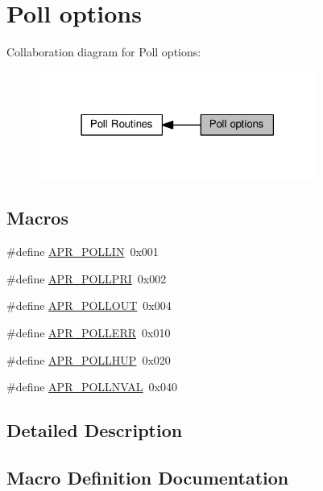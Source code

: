 \hypertarget{group__pollopts}{}\section{Poll options}
\label{group__pollopts}
Collaboration diagram for Poll options\+:
\nopagebreak
\begin{figure}[H]
\begin{center}
\leavevmode
\includegraphics[width=259pt]{group__pollopts}
\end{center}
\end{figure}
\subsection*{Macros}
\begin{DoxyCompactItemize}
\item 
\#define \hyperlink{group__pollopts_ga746222e6b858bc2fc77328d59f78e788}{A\+P\+R\+\_\+\+P\+O\+L\+L\+IN}~0x001
\item 
\#define \hyperlink{group__pollopts_ga196c38e1914077c4c9a0cf3ce87f1b9c}{A\+P\+R\+\_\+\+P\+O\+L\+L\+P\+RI}~0x002
\item 
\#define \hyperlink{group__pollopts_ga6fb703db1d11e2c5f66d8c6146e56053}{A\+P\+R\+\_\+\+P\+O\+L\+L\+O\+UT}~0x004
\item 
\#define \hyperlink{group__pollopts_ga6f5a72fd9cf3f5dcf174acce0b4b77ee}{A\+P\+R\+\_\+\+P\+O\+L\+L\+E\+RR}~0x010
\item 
\#define \hyperlink{group__pollopts_gace76603c4fa4b56f8b5977ff1ceb6f3b}{A\+P\+R\+\_\+\+P\+O\+L\+L\+H\+UP}~0x020
\item 
\#define \hyperlink{group__pollopts_ga132da215e207d4685fb467cc64a73f1b}{A\+P\+R\+\_\+\+P\+O\+L\+L\+N\+V\+AL}~0x040
\end{DoxyCompactItemize}


\subsection{Detailed Description}


\subsection{Macro Definition Documentation}
